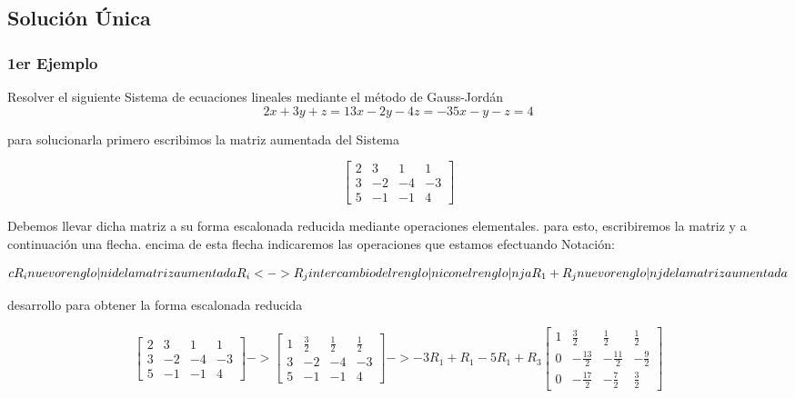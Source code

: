 \documentclass{article}
\begin{document}
\subsection{Solución Única}

\subsubsection{1er Ejemplo}
Resolver el siguiente Sistema de ecuaciones lineales mediante
el método de Gauss-Jordán
\[
  2x + 3y + z = 1
  3x-2y-4z= -3
  5x-y-z = 4
\]

para solucionarla primero escribimos la matriz aumentada del Sistema

\[
    \begin{bmatrix}2 & 3 & 1 & 1 \\ 3  & -2 & -4 & -3 \\ 5  & -1 & -1  & 4 \end{bmatrix}
\]



Debemos llevar dicha matriz a su forma escalonada reducida mediante operaciones elementales.
para esto, escribiremos la matriz y a continuación una flecha. encima de esta flecha indicaremos las operaciones
que estamos efectuando
Notación:

\[
    cR_i \space nuevo renglo|n i de la matriz aumentada \space
    R_i <-> R_j intercambio del renglo|n i  con el renglo|n j
    aR_1 + R_j nuevo renglo|n j de la matriz aumentada
\]

desarrollo para obtener la forma escalonada reducida


\[
    \begin{bmatrix}2 & 3 & 1 & 1 \\ 3  & -2 & -4 & -3 \\ 5  & -1 & -1  & 4 \end{bmatrix}
    ->
    \begin{bmatrix}1 & \frac{3}{2} & \frac{1}{2} & \frac{1}{2} \\ 3  & -2 & -4 & -3 \\ 5  & -1 & -1  & 4 \end{bmatrix}
    -> -3R_1 + R_1
    -5R_1+R_3
    \begin{bmatrix} 1 & \frac{3}{2} & \frac{1}{2} & \frac{1}{2} \\ 0  &  - \frac{13}{2} & - \frac{11}{2} & -\frac{9}{2} \\ 0  & -\frac{17}{2} & -\frac{7}{2}  & \frac{3}{2} \end{bmatrix}
\]
\end{document}
